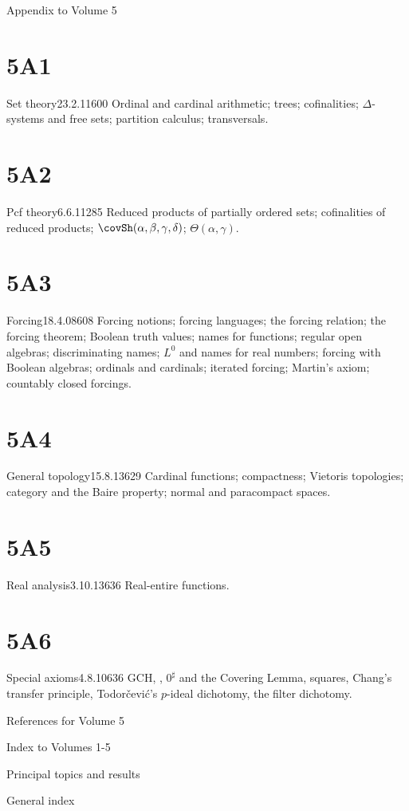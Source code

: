 
Appendix to Volume 5


\section{5A1}{Set theory}{23.2.11}{}{600}
{Ordinal and cardinal arithmetic;  trees;  cofinalities;
$\Delta$-systems and free sets;  partition calculus;
transversals.}

\section{5A2}{Pcf theory}{6.6.11}{}{285}
{Reduced products of partially ordered sets;
cofinalities of reduced products;  $\covSh(\alpha,\beta,\gamma,\delta)$;
$\Theta(\alpha,\gamma)$.}

\section{5A3}{Forcing}{18.4.08}{}{608}
{Forcing notions;  forcing languages;  the forcing relation;  the forcing
theorem;  Boolean truth values;  names for functions;
regular open algebras;  discriminating
names;  $L^0$ and names for real numbers;  forcing with Boolean algebras; 
ordinals and cardinals;  iterated forcing;  Martin's axiom;  countably
closed forcings.}

\section{5A4}{General topology}{15.8.13}{}{629}
{Cardinal functions;  compactness;  Vietoris topologies;  
category and the Baire property;  normal and paracompact spaces.}

\section{5A5}{Real analysis}{3.10.13}{}{636}
{Real-entire functions.}

\section{5A6}{Special axioms}{4.8.10}{}{636}
{GCH, \VeqL, $0^{\sharp}$ and the Covering Lemma, squares,
Chang's transfer principle, Todor\v{c}evi\'c's $p$-ideal dichotomy, the
filter dichotomy.}


References for Volume 5  
  
\medskip 

Index to Volumes 1-5
     
\qquad Principal topics and results 
     
\qquad General index 
     
